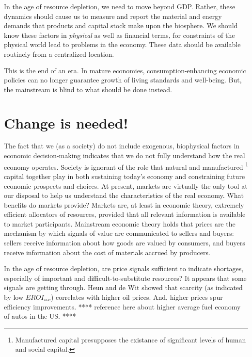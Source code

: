 In the age of resource depletion, 
we need to move beyond GDP.
Rather, these dynamics should cause us to measure and report
the material and energy demands that products and capital stock 
make upon the biosphere.
We should know these factors 
in \emph{physical} as well as financial terms,
for constraints of the physical world 
lead to problems in the economy.
These data should be available routinely from a centralized location.

This is the end of an era.
In mature economies, consumption-enhancing 
economic policies can no longer guarantee 
growth of living standards and well-being.
But, the mainstream is blind to what should be done instead. 


\section{Change is needed!}
\label{sec:change_needed}

The fact that we (as a society) do not include exogenous, biophysical factors 
in economic decision-making indicates that
we do not fully understand how the real economy operates.
Society is ignorant of the role that natural and manufactured%
	\footnote{
	Manufactured capital presupposes the existance of 
	significant levels of human and social capital.
	}
capital together play in both sustaining today's economy and 
constraining future economic prospects and choices.
At present, markets are virtually the only tool at our disposal
to help us understand the characteristics of the real economy.
What benefits do markets provide?
Markets are, at least in economic theory, extremely efficient allocators of resources,
provided that all relevant information is available to market participants.
Mainstream economic theory holds that prices are the mechanism by which signals
of value are communicated to sellers and buyers:
sellers receive information about how goods are valued by consumers, and
buyers receive information about the cost of materials accrued by producers.

In the age of resource depletion, 
are price signals sufficient to indicate shortages, 
especially of important and difficult-to-substitute resources?
It appears that some signals are getting through.
Heun and de Wit
showed that scarcity (as indicated by low $EROI_{soc}$)
correlates with higher oil prices.\cite{Heun:2012ek}
And, higher prices spur efficiency improvements. 
**** reference here about higher average fuel economy of autos in the US. ****

